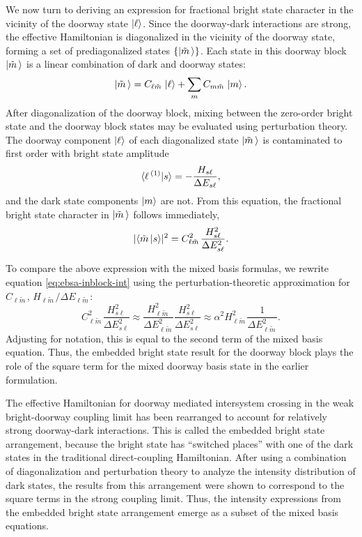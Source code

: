 \documentclass[12pt]{mitthesis}
\newcommand{\tm}{\tilde{m}\,}
\begin{document}
We now turn to deriving an expression for fractional bright state
character in the vicinity of the doorway state $\mathinner{|{\ell}\rangle}$.  Since
the doorway-dark interactions are strong, the effective Hamiltonian is
diagonalized in the vicinity of the doorway state, forming a set of
prediagonalized states $\lbrace \ket{\tm} \rbrace$.  Each state in
this doorway block $\ket{\tm}$ is a linear combination of dark and
doorway states:
\begin{equation}
  \label{eq:ebsa-block}
  \ket{\tm} = C_{\ell \tm} \ket{\ell} + \sum_m C_{m \tm} \ket{m}.
\end{equation}
After diagonalization of the doorway block, mixing between the
zero-order bright state and the doorway block states may be evaluated
using perturbation theory. The doorway component $\mathinner{|{\ell}\rangle}$ of each
diagonalized state $\ket{\tm}$ is contaminated to first order with
bright state amplitude
\begin{equation}
  \label{eq:ebsa-inblock-overlap}
  \mathinner{\langle{\ell\,^{(1)}|s}\rangle} = - \frac{H_{s\ell}}{\Delta E_{s\ell}},
\end{equation}
and the dark state components $\mathinner{|{m}\rangle}$ are not. From this equation,
the fractional bright state character in $\ket{\tm}$ follows
immediately,
\begin{equation}
  \label{eq:ebsa-inblock-int}
  \lvert \braket{\tm|s} \rvert^2 =
  C_{\ell \tm}^2 \frac{H_{s\ell}^2}{\Delta E_{s\ell}^2}.
\end{equation}

To compare the above expression with the mixed basis formulas,
we rewrite equation \ref{eq:ebsa-inblock-int} using the
perturbation-theoretic approximation for $C_{\ell\tm}$, $H_{\ell\tm} /
\Delta E_{\ell\tm}$:
\begin{equation}
  \label{eq:ebsa-inblock-int-approx}
  C_{\ell \tm}^2 \frac{H_{s\ell}^2}{\Delta E_{s\ell}^2} \approx
  \frac{H_{\ell \tm}^2}{\Delta E_{\ell \tm}^2} 
  \frac{ H_{s\ell}^2}{ \Delta E_{s\ell}^2} \approx
  \alpha^2 H_{\ell \tm}^2 \frac{1}{\Delta E_{\ell \tm}^2}.
\end{equation}
Adjusting for notation, this is equal to the second term of the mixed
basis equation.  Thus, the embedded bright state result for the doorway
block plays the role of the square term for the mixed doorway basis
state in the earlier formulation.

The effective Hamiltonian for doorway mediated intersystem crossing in
the weak bright-doorway coupling limit has been rearranged to account
for relatively strong doorway-dark interactions. This is called the
embedded bright state arrangement, because the bright state has
``switched places'' with one of the dark states in the traditional
direct-coupling Hamiltonian. After using a combination of
diagonalization and perturbation theory to analyze the intensity
distribution of dark states, the results from this arrangement were
shown to correspond to the square terms in the strong coupling
limit. Thus, the intensity expressions from the embedded bright state
arrangement emerge as a subset of the mixed basis equations.
\end{document}
